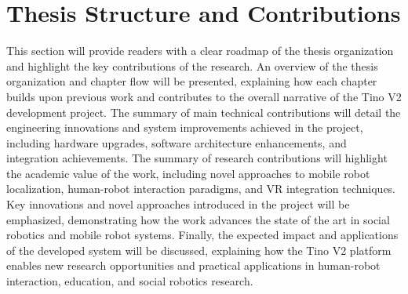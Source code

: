 \section{Thesis Structure and Contributions}
This section will provide readers with a clear roadmap of the thesis organization and highlight the key contributions of the research. An overview of the thesis organization and chapter flow will be presented, explaining how each chapter builds upon previous work and contributes to the overall narrative of the Tino V2 development project. The summary of main technical contributions will detail the engineering innovations and system improvements achieved in the project, including hardware upgrades, software architecture enhancements, and integration achievements. The summary of research contributions will highlight the academic value of the work, including novel approaches to mobile robot localization, human-robot interaction paradigms, and VR integration techniques. Key innovations and novel approaches introduced in the project will be emphasized, demonstrating how the work advances the state of the art in social robotics and mobile robot systems. Finally, the expected impact and applications of the developed system will be discussed, explaining how the Tino V2 platform enables new research opportunities and practical applications in human-robot interaction, education, and social robotics research.
